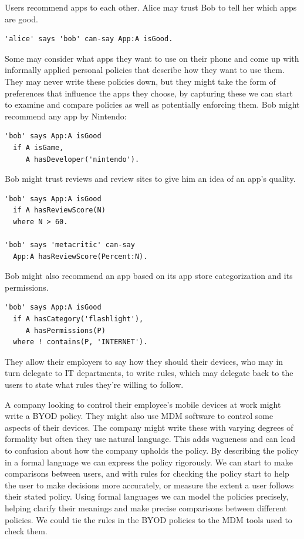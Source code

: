 \documentclass[thesis.tex]{subfiles}
\begin{document}
Users recommend apps to each other. Alice may trust Bob to tell
her which apps are good.
%
\begin{lstlisting}
'alice' says 'bob' can-say App:A isGood.
\end{lstlisting}
%
Some may consider what apps they want to use on their phone and come up with
informally applied personal policies that describe how they want to use them.
They may never write these policies down, but they might take the form of
preferences that influence the apps they choose, by capturing these we can start
to examine and compare policies as well as potentially enforcing them. Bob might recommend any app by Nintendo:
%
\begin{lstlisting}
'bob' says App:A isGood
  if A isGame,
     A hasDeveloper('nintendo').
\end{lstlisting}
%
Bob might trust reviews and review sites to give him an idea of an app's quality. 
%
\begin{lstlisting}
'bob' says App:A isGood
  if A hasReviewScore(N)
  where N > 60.
 
'bob' says 'metacritic' can-say
  App:A hasReviewScore(Percent:N).
\end{lstlisting}
%
Bob might also recommend an app based on its app store categorization and its permissions.
%
\begin{lstlisting}
'bob' says App:A isGood
  if A hasCategory('flashlight'),
     A hasPermissions(P)
  where ! contains(P, 'INTERNET').
\end{lstlisting}

They allow their employers to say how they should their devices, who
may in turn delegate to IT departments, to write rules, which may
delegate back to the users to state what rules they're willing to
follow.

A company looking to control their employee's mobile devices at work might write
a \ac{BYOD} policy. They might also use \ac{MDM} software to control some
aspects of their devices. The company might write these with varying degrees of
formality but often they use natural language. This adds vagueness
and can lead to confusion about how the company upholds the policy. By
describing the policy in a formal language we can express the policy
rigorously. We can start to make comparisons between users, and with rules
for checking the policy start to help the user to make decisions more
accurately, or measure the extent a user follows their stated policy. Using
formal languages we can model the policies precisely, helping clarify their
meanings and make precise comparisons between different policies. We could tie the
rules in the \ac{BYOD} policies to the \ac{MDM} tools used to
check them.
\end{document}
